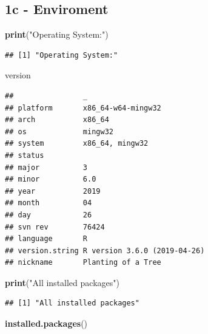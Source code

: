\documentclass[]{article}
\newenvironment{Shaded}{}{}
\newcommand{\KeywordTok}[1]{\textcolor[rgb]{0.00,0.44,0.13}{\textbf{#1}}}
\newcommand{\NormalTok}[1]{#1}
\newcommand{\StringTok}[1]{\textcolor[rgb]{0.25,0.44,0.63}{#1}}
\begin{document}
\hypertarget{c---enviroment}{%
\subsection{1c - Enviroment}\label{c---enviroment}}

\begin{Shaded}
\begin{Highlighting}[]
\KeywordTok{print}\NormalTok{(}\StringTok{"Operating System:"}\NormalTok{)}
\end{Highlighting}
\end{Shaded}

\begin{verbatim}
## [1] "Operating System:"
\end{verbatim}

\begin{Shaded}
\begin{Highlighting}[]
\NormalTok{version}
\end{Highlighting}
\end{Shaded}

\begin{verbatim}
##                _                           
## platform       x86_64-w64-mingw32          
## arch           x86_64                      
## os             mingw32                     
## system         x86_64, mingw32             
## status                                     
## major          3                           
## minor          6.0                         
## year           2019                        
## month          04                          
## day            26                          
## svn rev        76424                       
## language       R                           
## version.string R version 3.6.0 (2019-04-26)
## nickname       Planting of a Tree
\end{verbatim}

\begin{Shaded}
\begin{Highlighting}[]
\KeywordTok{print}\NormalTok{(}\StringTok{"All installed packages"}\NormalTok{)}
\end{Highlighting}
\end{Shaded}

\begin{verbatim}
## [1] "All installed packages"
\end{verbatim}

\begin{Shaded}
\begin{Highlighting}[]
\KeywordTok{installed.packages}\NormalTok{()}
\end{Highlighting}
\end{Shaded}
\end{document}
